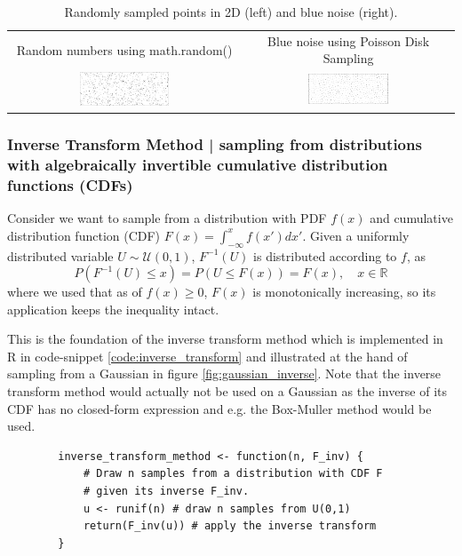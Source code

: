 \begin{table}[H]
    \centering
    \begin{tabular}{c|c}
        \textcolor{blue1}{Random numbers using math.random()} & \textcolor{blue1}{Blue noise using Poisson Disk Sampling} \\
        \includegraphics[width=0.4\textwidth]{figures/random.png} & \includegraphics[width=0.4\textwidth]{figures/bluenoise.png}
    \end{tabular}
    \caption{Randomly sampled points in 2D (left) and blue noise (right).}
    \label{tab:bluenoise}
\end{table}

\subsubsection{Inverse Transform Method | sampling from distributions with algebraically invertible cumulative distribution functions (CDFs)}
Consider we want to sample from a distribution with PDF $f(x)$ and
cumulative distribution function (CDF) $F(x) = \int_{-\infty}^x f(x') dx'$. Given a uniformly distributed variable
$U \sim \mathcal{U}(0,1)$, $F^{-1}(U)$ is distributed according to $f$, as
\begin{equation}
    P(F^{-1}(U) \leq x) = P(U \leq F(x)) = F(x), \quad x \in \mathbb{R}
\end{equation}
where we used that as of $f(x) \geq 0$, $F(x)$ is monotonically increasing, so its application keeps the inequality intact.

This is the foundation of the inverse transform method which is implemented in R in code-snippet \ref{code:inverse_transform} and illustrated
at the hand of sampling from a Gaussian in figure \ref{fig:gaussian_inverse}. Note that the inverse transform method would actually not
be used on a Gaussian as the inverse of its CDF has no closed-form expression and e.g. the Box-Muller method \citep{box58}
would be used.

\begin{codebox}[!htb]
    \begin{verbatim}
        inverse_transform_method <- function(n, F_inv) {
            # Draw n samples from a distribution with CDF F
            # given its inverse F_inv.
            u <- runif(n) # draw n samples from U(0,1)
            return(F_inv(u)) # apply the inverse transform
        }
    \end{verbatim}
    \caption{Inverse Transform Method in R}
    \label{code:inverse_transform}
\end{codebox}

